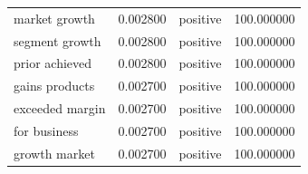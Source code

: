 \begin{table}
\begin{tabular}{lrlr}
market growth & 0.002800 & positive & 100.000000 \\
segment growth & 0.002800 & positive & 100.000000 \\
prior achieved & 0.002800 & positive & 100.000000 \\
gains products & 0.002700 & positive & 100.000000 \\
exceeded margin & 0.002700 & positive & 100.000000 \\
for business & 0.002700 & positive & 100.000000 \\
growth market & 0.002700 & positive & 100.000000 \\
\bottomrule
\end{tabular}
\end{table}
